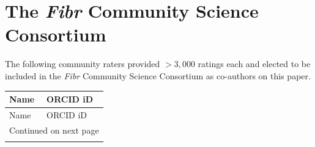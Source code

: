 \documentclass[fleqn,10pt,inline]{wlscirep}
\begin{document}
\appendix
\begin{appendixbox}
\label{app:fibr-consortium}
\section*{The \emph{Fibr} Community Science Consortium}

The following community raters
provided $>3,000$ ratings each and elected to be included in the \emph{Fibr} Community
Science Consortium as co-authors on this paper.

\begin{longtable}{ll}
\toprule
                      Name &            ORCID iD \\
\midrule
\endfirsthead

\toprule
                      Name &            ORCID iD \\
\midrule
\endhead
\midrule
\multicolumn{2}{r}{{Continued on next page}} \\
\midrule
\endfoot


\end{longtable}
\end{appendixbox}
\end{document}
